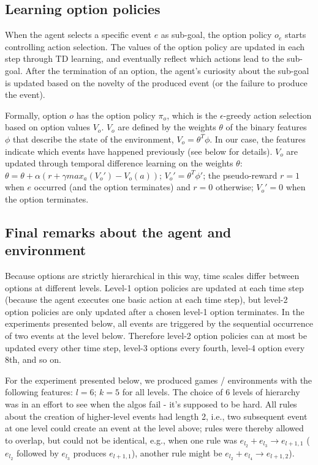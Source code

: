 \documentclass{article}
\begin{document}
\subsection{Learning option policies}

When the agent selects a specific event $e$ as sub-goal, the option policy $o_e$ starts controlling action selection. The values of the option policy are updated in each step through TD learning, and eventually reflect which actions lead to the sub-goal. After the termination of an option, the agent's curiosity about the sub-goal is updated based on the novelty of the produced event (or the failure to produce the event).

Formally, option $o$ has the option policy $\pi_o$, which is the $\epsilon$-greedy action selection based on option values $V_o$. $V_o$ are defined by the weights $\theta$ of the binary features $\phi$ that describe the state of the environment, $V_o = \theta^T \phi$. In our case, the features indicate which events have happened previously (see below for details).
$V_o$ are updated through temporal difference learning on the weights $\theta$: $\theta = \theta + \alpha (r + \gamma max_a(V_o') - V_o(a))$; $V_o' = \theta^T \phi'$; the pseudo-reward $r = 1$ when $e$ occurred (and the option terminates) and $r = 0$ otherwise; $V_o' = 0$ when the option terminates. 

\subsection{Final remarks about the agent and environment}

Because options are strictly hierarchical in this way, time scales differ between options at different levels. Level-1 option policies are updated at each time step (because the agent executes one basic action at each time step), but level-2 option policies are only updated after a chosen level-1 option terminates. In the experiments presented below, all events are triggered by the sequential occurrence of two events at the level below. Therefore level-2 option policies can at most be updated every other time step, level-3 options every fourth, level-4 option every 8th, and so on.

For the experiment presented below, we produced games / environments with the following features: $l = 6$; $k = 5$ for all levels. The choice of 6 levels of hierarchy was in an effort to see when the algos fail - it's supposed to be hard. All rules about the creation of higher-level events had length 2, i.e., two subsequent event at one level could create an event at the level above; rules were thereby allowed to overlap, but could not be identical, e.g., when one rule was $e_{l_2} + e_{l_3} \rightarrow e_{l+1, 1}$ ($e_{l_2}$ followed by $e_{l_3}$ produces $e_{l+1, 1}$), another rule might be $e_{l_2} + e_{l_4} \rightarrow e_{l+1, 2}$).
\end{document}
